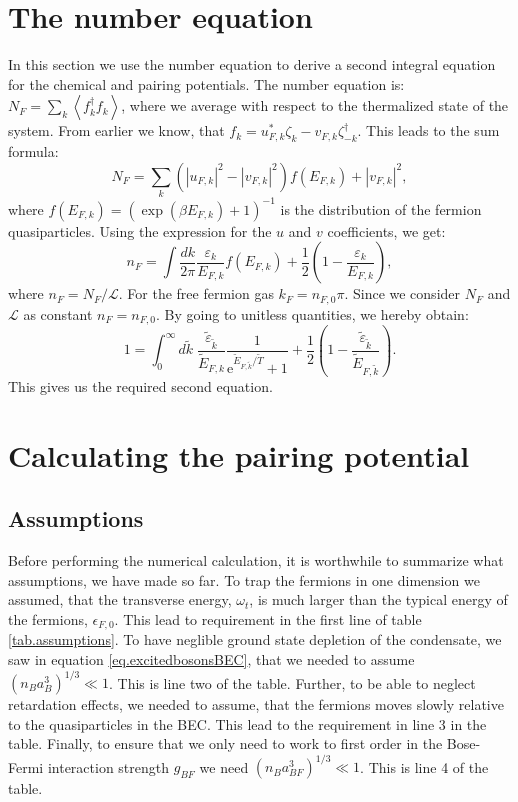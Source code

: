 \section{The number equation} \label{sec.chemicalpotential.numberequation}
In this section we use the number equation to derive a second integral equation for the chemical and pairing potentials. The number equation is: $N_F = \sum_k \left \langle f_k^\dagger f_k \right \rangle$, where we average with respect to the thermalized state of the system. From earlier we know, that $f_k = u_{F,k}^* \zeta_k -v_{F,k} \zeta_{-k}^\dagger$. This leads to the sum formula:
\begin{equation}
N_F = \sum_k \left(|u_{F,k}|^2-|v_{F,k}|^2\right) f(E_{F,k}) + |v_{F,k}|^2,\nonumber
\end{equation}
where $f(E_{F,k}) = (\exp(\beta E_{F,k}) + 1)^{-1}$ is the distribution of the fermion quasiparticles. Using the expression for the $u$ and $v$ coefficients, we get:
\begin{equation}
n_F = \int \frac{dk}{2\pi} \frac{\varepsilon_k}{E_{F,k}}f(E_{F,k}) + \frac{1}{2}\left(1 - \frac{\varepsilon_k}{E_{F,k}}\right), \nonumber
\end{equation}
where $n_F = N_F/\mathcal{L}$. For the free fermion gas $k_F = n_{F,0}\pi$. Since we consider $N_F$ and $\mathcal{L}$ as constant $n_F = n_{F,0}$. By going to unitless quantities, we hereby obtain:
\begin{equation}
1 = \int_0^\infty d\tilde{k} \; \frac{\tilde{\varepsilon}_{\tilde{k}}}{\tilde{E}_{F,k}}\frac{1}{\text{e}^{ \tilde{E}_{F,\tilde{k}}/\tilde{T} } + 1 } + \frac{1}{2}\left(1 - \frac{\tilde{\varepsilon}_{\tilde{k}}}{\tilde{E}_{F,\tilde{k}}}\right). 
\label{eq.NumberEquationUnitless}
\end{equation}
This gives us the required second equation.


\section{Calculating the pairing potential} \label{sec.pairingandchemicalpotential.numericalcalculation}
\subsection{Assumptions}
Before performing the numerical calculation, it is worthwhile to summarize what assumptions, we have made so far. To trap the fermions in one dimension we assumed, that the transverse energy, $\omega_t$, is much larger than the typical energy of the fermions, $\epsilon_{F,0}$. This lead to requirement in the first line of table \ref{tab.assumptions}. To have neglible ground state depletion of the condensate, we saw in equation \eqref{eq.excitedbosonsBEC}, that we needed to assume $(n_Ba_B^3)^{1/3}\ll 1$. This is line two of the table. Further, to be able to neglect retardation effects, we needed to assume, that the fermions moves slowly relative to the quasiparticles in the BEC. This lead to the requirement in line 3 in the table. Finally, to ensure that we only need to work to first order in the Bose-Fermi interaction strength $g_{BF}$ we need $(n_Ba_{BF}^3)^{1/3} \ll 1$. This is line 4 of the table. 

